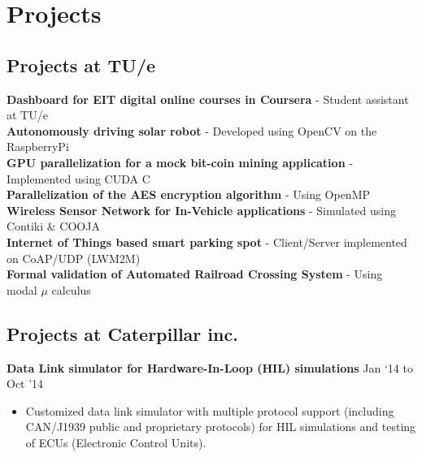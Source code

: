 \documentclass[a4paper,10pt]{article} %
\begin{document}

\section{Projects}
\subsection{Projects at TU/e}
\textbf{Dashboard for EIT digital online courses in Coursera } - Student assistant at TU/e\\
\textbf{Autonomously driving solar robot} - Developed using OpenCV on the RaspberryPi\\
\textbf{GPU parallelization for a mock bit-coin mining application} - Implemented using CUDA C\\
\textbf{Parallelization of the AES encryption algorithm} - Using OpenMP\\
\textbf{Wireless Sensor Network for In-Vehicle applications} - Simulated using Contiki \& COOJA\\
\textbf{Internet of Things based smart parking spot} - Client/Server implemented on CoAP/UDP (LWM2M)\\
\textbf{Formal validation of Automated Railroad Crossing System} - Using modal $\mu$ calculus\\

\subsection{Projects at Caterpillar inc.}

 \textbf{Data Link simulator for Hardware-In-Loop (HIL) simulations} \hfill Jan ‘14 to Oct '14 
\begin{itemize} \itemsep -2pt %
\item Customized data link simulator with multiple protocol support (including CAN/J1939 public and proprietary protocols) for HIL simulations and testing of ECUs (Electronic Control Units). 
\end{itemize}
\end{document}

